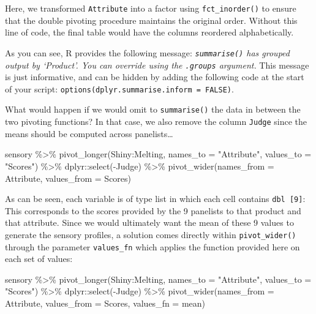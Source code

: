 \documentclass[
]{krantz}
\makeatletter
\newenvironment{Shaded}{\begin{snugshade}}{\end{snugshade}}
\newcommand{\AttributeTok}[1]{\textcolor[rgb]{0.61,0.61,0.61}{#1}}
\newcommand{\FunctionTok}[1]{\textcolor[rgb]{0,0,0}{#1}}
\newcommand{\NormalTok}[1]{#1}
\newcommand{\SpecialCharTok}[1]{\textcolor[rgb]{0,0,0}{#1}}
\newcommand{\StringTok}[1]{\textcolor[rgb]{0.5,0.5,0.5}{#1}}
\renewenvironment{quote}{\begin{VF}}{\end{VF}}
\newenvironment{kframe}{%
\medskip{}
\setlength{\fboxsep}{.8em}
 \def\at@end@of@kframe{}%
 \ifinner\ifhmode%
  \def\at@end@of@kframe{\end{minipage}}%
  \begin{minipage}{\columnwidth}%
 \fi\fi%
 \def\FrameCommand##1{\hskip\@totalleftmargin \hskip-\fboxsep
 \colorbox{shadecolor}{##1}\hskip-\fboxsep
     \hskip-\linewidth \hskip-\@totalleftmargin \hskip\columnwidth}%
 \MakeFramed {\advance\hsize-\width
   \@totalleftmargin\z@ \linewidth\hsize
   \@setminipage}}%
 {\par\unskip\endMakeFramed%
 \at@end@of@kframe}
\renewenvironment{Shaded}{\begin{kframe}}{\end{kframe}}
\makeatother
\begin{document}
Here, we transformed \texttt{Attribute} into a factor using \texttt{fct\_inorder()} to ensure that the double pivoting procedure maintains the original order. Without this line of code, the final table would have the columns reordered alphabetically.

\begin{quote}
As you can see, R provides the following message: \emph{\texttt{summarise()} has grouped output by `Product'. You can override using the \texttt{.groups} argument.} This message is just informative, and can be hidden by adding the following code at the start of your script: \texttt{options(dplyr.summarise.inform\ =\ FALSE)}.
\end{quote}

What would happen if we would omit to \texttt{summarise()} the data in between the two pivoting functions? In that case, we also remove the column \texttt{Judge} since the means should be computed across panelists\ldots{}

\begin{Shaded}
\begin{Highlighting}[]
\NormalTok{sensory }\SpecialCharTok{\%\textgreater{}\%}
  \FunctionTok{pivot\_longer}\NormalTok{(Shiny}\SpecialCharTok{:}\NormalTok{Melting, }
               \AttributeTok{names\_to =} \StringTok{"Attribute"}\NormalTok{, }\AttributeTok{values\_to =} \StringTok{"Scores"}\NormalTok{) }\SpecialCharTok{\%\textgreater{}\%}
\NormalTok{  dplyr}\SpecialCharTok{::}\FunctionTok{select}\NormalTok{(}\SpecialCharTok{{-}}\NormalTok{Judge) }\SpecialCharTok{\%\textgreater{}\%}
  \FunctionTok{pivot\_wider}\NormalTok{(}\AttributeTok{names\_from =}\NormalTok{ Attribute, }\AttributeTok{values\_from =}\NormalTok{ Scores)}
\end{Highlighting}
\end{Shaded}

As can be seen, each variable is of type list in which each cell contains \texttt{dbl\ {[}9{]}}: This corresponds to the scores provided by the 9 panelists to that product and that attribute. Since we would ultimately want the mean of these 9 values to generate the sensory profiles, a solution comes directly within \texttt{pivot\_wider()} through the parameter \texttt{values\_fn} which applies the function provided here on each set of values:

\begin{Shaded}
\begin{Highlighting}[]
\NormalTok{sensory }\SpecialCharTok{\%\textgreater{}\%}
  \FunctionTok{pivot\_longer}\NormalTok{(Shiny}\SpecialCharTok{:}\NormalTok{Melting, }
               \AttributeTok{names\_to =} \StringTok{"Attribute"}\NormalTok{, }\AttributeTok{values\_to =} \StringTok{"Scores"}\NormalTok{) }\SpecialCharTok{\%\textgreater{}\%}
\NormalTok{  dplyr}\SpecialCharTok{::}\FunctionTok{select}\NormalTok{(}\SpecialCharTok{{-}}\NormalTok{Judge) }\SpecialCharTok{\%\textgreater{}\%}
  \FunctionTok{pivot\_wider}\NormalTok{(}\AttributeTok{names\_from =}\NormalTok{ Attribute, }\AttributeTok{values\_from =}\NormalTok{ Scores, }
              \AttributeTok{values\_fn =}\NormalTok{ mean)}
\end{Highlighting}
\end{Shaded}
\end{document}
